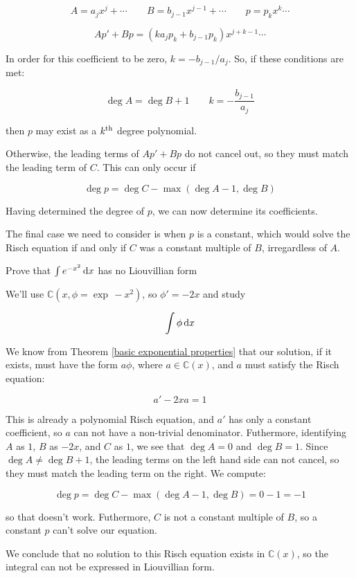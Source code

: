 $$A = a_j x^j + \cdots \qquad B = b_{j-1} x^{j-1} + \cdots \qquad p = p_k x^k \cdots$$

$$A p' + B p = (k a_j p_k + b_{j-1} p_k) x^{j+k-1} \cdots$$

In order for this coefficient to be zero, $k=-b_{j-1}/a_j$.
So, if these conditions are met:

$$\deg A = \deg B + 1 \qquad k=-\frac{b_{j-1}}{a_j} $$

then $p$ may exist as a $k^{\rm th}$ degree polynomial.

Otherwise, the leading terms of $A p' + B p$ do not cancel out,
so they must match the leading term of $C$.  This can only
occur if

$$\deg p = \deg C - \max(\deg A - 1, \deg B)$$

Having determined the degree of $p$, we can now determine its
coefficients.

The final case we need to consider is when $p$ is a constant, which
would solve the Risch equation if and only if $C$ was a constant
multiple of $B$, irregardless of $A$.

\vfill\eject

\example Prove that $\int e^{-x^2}\, {\rm d}x$ has no Liouvillian form

We'll use ${\mathbb C}(x, \phi = \exp\, -x^2)$, so $\phi' = -2x$ and
study

$$\int \phi \, {\rm d}x$$

We know from Theorem \ref{basic exponential properties} that our
solution, if it exists, must have the form $a\phi$, where $a \in
{\mathbb C}(x)$, and $a$ must satisfy the Risch equation:

$$a' - 2x a = 1$$

This is already a polynomial Risch equation, and $a'$ has only
a constant coefficient, so $a$ can not have a non-trivial denominator.
Futhermore, identifying $A$ as $1$, $B$ as $-2x$, and $C$ as $1$,
we see that $\deg A = 0$ and $\deg B = 1$.  Since $\deg A \ne \deg B + 1$,
the leading terms on the left hand side can not cancel,
so they must match the leading term on the right.
We compute:

$$\deg p = \deg C - \max(\deg A - 1, \deg B) = 0 - 1 = -1$$

so that doesn't work.  Futhermore, $C$ is not a constant
multiple of $B$, so a constant $p$ can't solve our equation.

We conclude that no solution to this Risch equation exists in ${\mathbb C}(x)$,
so the integral can not be expressed in Liouvillian form.

